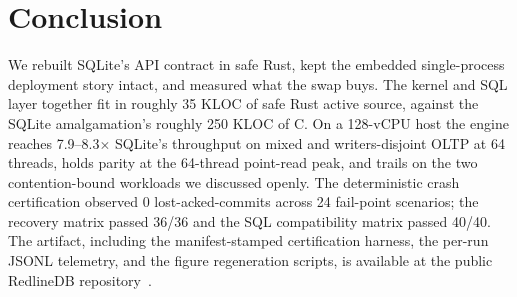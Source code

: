 \section{Conclusion}\label{sec:conclusion}

We rebuilt SQLite's API contract in safe Rust, kept the embedded
single-process deployment story intact, and measured what the swap
buys. The kernel and SQL layer together fit in roughly 35 KLOC of
safe Rust active source, against the SQLite amalgamation's roughly
250 KLOC of C. On a 128-vCPU host the engine reaches 7.9--8.3$\times$
SQLite's throughput on mixed and writers-disjoint OLTP at 64 threads,
holds parity at the 64-thread point-read peak, and trails on the two
contention-bound workloads we discussed openly. The deterministic
crash certification observed 0 lost-acked-commits across 24
fail-point scenarios; the recovery matrix passed 36/36 and the SQL
compatibility matrix passed 40/40. The artifact, including the
manifest-stamped certification harness, the per-run JSONL telemetry,
and the figure regeneration scripts, is available at the public
RedlineDB repository~\cite{redlinedb}.
